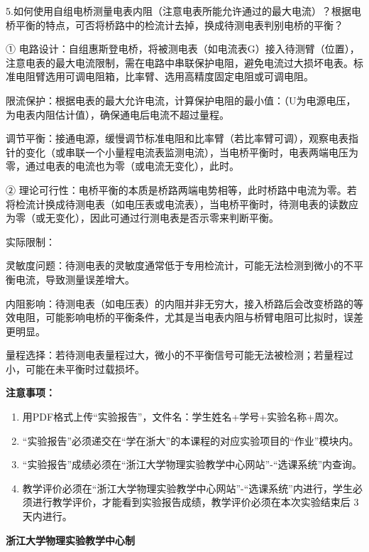 \documentclass[10pt,a4paper]{ctexart}
\newcommand{\sihao}{\fontsize{14pt}{18pt}\selectfont}
\newcommand{\xiaosi}{\fontsize{12pt}{16pt}\selectfont}
\begin{document}
5.如何使用自组电桥测量电表内阻（注意电表所能允许通过的最大电流）？根据电桥平衡的特点，可否将桥路中的检流计去掉，换成待测电表判别电桥的平衡？

①
电路设计：自组惠斯登电桥，将被测电表（如电流表G）接入待测臂（位置），注意电表的最大电流限制，需在电路中串联保护电阻，避免电流过大损坏电表。标准电阻臂选用可调电阻箱，比率臂、选用高精度固定电阻或可调电阻。

限流保护：根据电表的最大允许电流，计算保护电阻的最小值：（U为电源电压，为电表内阻估计值），确保通电后电流不超过量程。

调节平衡：接通电源，缓慢调节标准电阻和比率臂（若比率臂可调），观察电表指针的变化（或串联一个小量程电流表监测电流），当电桥平衡时，电表两端电压为零，通过电表的电流也为零（或电流无变化），此时。

②
理论可行性：电桥平衡的本质是桥路两端电势相等，此时桥路中电流为零。若将检流计换成待测电表（如电压表或电流表），当电桥平衡时，待测电表的读数应为零（或无变化），因此可通过行测电表是否示零来判断平衡。

实际限制：

灵敏度问题：待测电表的灵敏度通常低于专用检流计，可能无法检测到微小的不平衡电流，导致测量误差增大。

内阻影响：待测电表（如电压表）的内阻并非无穷大，接入桥路后会改变桥路的等效电阻，可能影响电桥的平衡条件，尤其是当电表内阻与桥臂电阻可比拟时，误差更明显。

量程选择：若待测电表量程过大，微小的不平衡信号可能无法被检测；若量程过小，可能在未平衡时过载损坏。

\newpage

\sihao\textbf{注意事项：}
\xiaosi
\begin{enumerate}
    \item 用PDF格式上传“实验报告”，文件名：学生姓名+学号+实验名称+周次。
    \item  “实验报告”必须递交在“学在浙大”的本课程的对应实验项目的“作业”模块内。
    \item  “实验报告”成绩必须在“浙江大学物理实验教学中心网站”-“选课系统”内查询。
    \item 教学评价必须在“浙江大学物理实验教学中心网站”-“选课系统”内进行，学生必须进行教学评价，才能看到实验报告成绩，教学评价必须在本次实验结束后 3 天内进行。
\end{enumerate}

\vspace{1cm}
\xiaosi\centering \textbf{浙江大学物理实验教学中心制}
\end{document}
